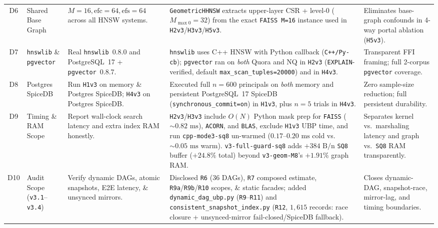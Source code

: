 \documentclass[conference]{IEEEtran}
\begin{document}
\begin{table}[t]
{{\begin{tabular}{clp{5.8cm}p{7.0cm}p{4.9cm}}
D6 & Shared Base Graph & $M=16, \text{efc}=64, \text{efs}=64$ across all HNSW systems. & \texttt{GeometricHHNSW} extracts upper-layer CSR + level-0 ($M_{\max 0}=32$) from the exact \texttt{FAISS M=16} instance used in \texttt{H2v3}/\texttt{H3v3}/\texttt{H5v3}. & Eliminates base-graph confounds in 4-way portal ablation (\texttt{H5v3}). \\
D7 & \texttt{hnswlib} \& \texttt{pgvector} & Real \texttt{hnswlib}~0.8.0 and PostgreSQL~17 + \texttt{pgvector}~0.8.7. & \texttt{hnswlib} uses C++ HNSW with Python callback (\texttt{C++/Py-cb}); \texttt{pgvector} ran on \textit{both} Quora and NQ in \texttt{H2v3} (\texttt{EXPLAIN}-verified, default \texttt{max\_scan\_tuples=20000}) and in \texttt{H4v3}. & Transparent FFI framing; full 2-corpus \texttt{pgvector} coverage. \\
D8 & Postgres SpiceDB & Run \texttt{H1v3} on memory \& Postgres SpiceDB; \texttt{H4v3} on Postgres SpiceDB. & Executed full $n=600$ principals on \textit{both} memory and persistent PostgreSQL~17 SpiceDB (\texttt{synchronous\_commit=on}) in \texttt{H1v3}, plus $n=5$ trials in \texttt{H4v3}. & Zero sample-size reduction; full persistent durability. \\
D9 & Timing \& RAM Scope & Report wall-clock search latency and extra index RAM honestly. & \texttt{H2v3}/\texttt{H3v3} include $O(N)$ Python mask prep for \texttt{FAISS} (${\sim}0.82\text{ ms}$), \texttt{ACORN}, and \texttt{BLAS}, exclude \texttt{H1v3} UBP time, and run \texttt{cpp-mode3-sq8} un-warmed ($0.17$--$0.20\text{ ms}$ cold vs.\ ${\sim}0.05\text{ ms}$ warm). \texttt{v3-full-guard-sq8} adds $+384\text{ B/n}$ \texttt{SQ8} buffer ($+24.8\%$ total) beyond \texttt{v3-geom-M8}'s $+1.91\%$ graph RAM. & Separates kernel vs.\ marshaling latency and graph vs.\ \texttt{SQ8} RAM transparently. \\
D10 & Audit Scope (\texttt{v3.1}--\texttt{v3.4}) & Verify dynamic DAGs, atomic snapshots, E2E latency, \& unsynced mirrors. & Disclosed \texttt{R6} ($36$ DAGs), \texttt{R7} composed estimate, \texttt{R9a}/\texttt{R9b}/\texttt{R10} scopes, \& static facades; added \texttt{dynamic\_dag\_ubp.py} (\texttt{R9}--\texttt{R11}) and \texttt{consistent\_snapshot\_index.py} (\texttt{R12}, $1{,}615$ records: race closure + unsynced-mirror fail-closed/SpiceDB fallback). & Closes dynamic-DAG, snapshot-race, mirror-lag, and timing boundaries. \\
\bottomrule
\end{tabular}
}
}
\end{table}
\end{document}
